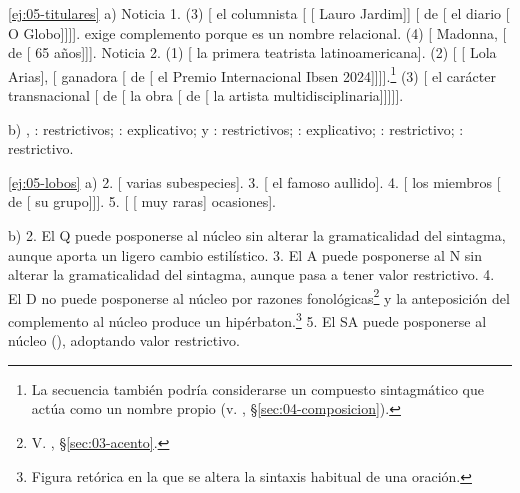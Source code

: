 \begin{solucion}{\ref{ej:05-titulares}}
a) Noticia 1. (3) [ el columnista [
[ Lauro Jardim]] [ de [
el diario [ O Globo]]]].  exige
complemento porque es un nombre relacional. (4) [ Madonna,
[ de [ 65 años]]].
Noticia 2. (1) [ la primera teatrista
latinoamericana]. (2) [ [ Lola Arias], [
ganadora [ de [ el
Premio Internacional Ibsen
2024]]]].\footnote{La secuencia  también podría considerarse un compuesto sintagmático que actúa como un
nombre propio (v. , §\ref{sec:04-composicion}).} (3) [
el carácter transnacional [ de
[ la obra [ de
[ la artista multidisciplinaria]]]]].

b) , : restrictivos; : explicativo;  y : restrictivos;
: explicativo;
: restrictivo; : restrictivo.
\end{solucion}

\begin{solucion}{\ref{ej:05-lobos}}
a) 2. [ varias subespecies]. 3. [
el famoso aullido]. 4. [ los
miembros [ de [ su
grupo]]]. 5. [ [ muy raras]
ocasiones].

b) 2. El Q  puede posponerse al núcleo  sin
alterar la gramaticalidad del sintagma, aunque aporta un ligero cambio
estilístico. 3. El A  puede posponerse al N sin alterar la
gramaticalidad del sintagma, aunque pasa a tener valor restrictivo. 4. El D
 no puede posponerse al núcleo por razones
fonológicas\footnote{V. , §\ref{sec:03-acento}.} y la anteposición del
complemento  al núcleo produce un
hipérbaton.\footnote{Figura retórica en la que se altera la sintaxis habitual de
una oración.} 5. El SA puede posponerse al núcleo (),
adoptando valor restrictivo.
\end{solucion}

